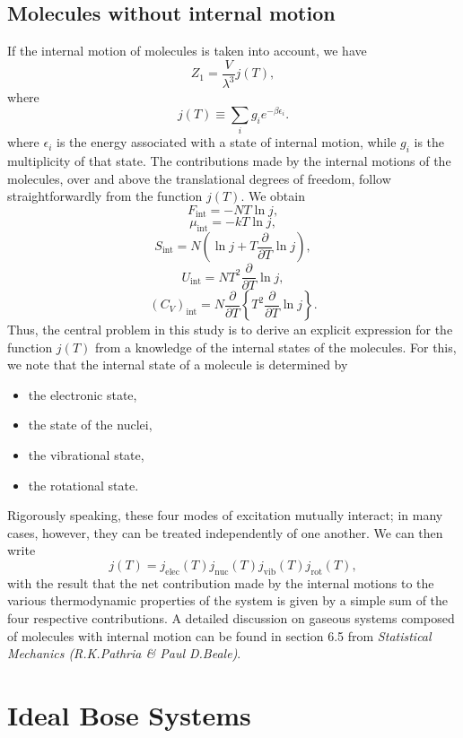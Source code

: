 \subsection{Molecules without internal motion}
If the internal motion of molecules is taken into account, we have
\[Z_1 = \frac{V}{\lambda^3}j(T),\] 
where
\[j(T) \equiv \sum_i g_i e^{-\beta \epsilon_i}.\] 
where $\epsilon_i$ is the energy associated with a state of internal motion, while $g_i$ is the multiplicity of that state.
The contributions made by the internal motions of the molecules, over and above the translational degrees of freedom, follow straightforwardly from the function $j(T)$. 
We obtain
\[F_{\mathrm{int}} = -NT\ln j,\] 
\[\mu_{\mathrm{int}} = -kT\ln j,\] 
\[S_{\mathrm{int}} = N\left(\ln j + T \frac{\partial}{\partial T}\ln j\right),\] 
\[U_{\mathrm{int}} = NT^2 \frac{\partial}{\partial T}\ln j,\] 
\[(C_V)_{\mathrm{int}} = N\frac{\partial}{\partial T} \left\{T^2 \frac{\partial}{\partial T} \ln j \right\} .\]
Thus, the central problem in this study is to derive an explicit expression for the function $j(T)$ from a knowledge of the internal states of the molecules. For this, we note that the internal state of a molecule is determined by
\begin{itemize}
\item the electronic state,
\item the state of the nuclei,
\item the vibrational state,
\item the rotational state.
\end{itemize}
\indent
Rigorously speaking, these four modes of excitation mutually interact; in many cases, however, they can be treated independently of one another. We can then write
\[j(T) = j_{\mathrm{elec}}(T)j_{\mathrm{nuc}}(T)j_{\mathrm{vib}}(T)j_{\mathrm{rot}}(T),\] 
with the result that the net contribution made by the internal motions to the various thermodynamic properties of the system is given by a simple sum of the four respective contributions.
A detailed discussion on gaseous systems composed of molecules with internal motion can be found in section 6.5 from \emph{Statistical Mechanics (R.K.Pathria \& Paul D.Beale)}.

\section{Ideal Bose Systems}
